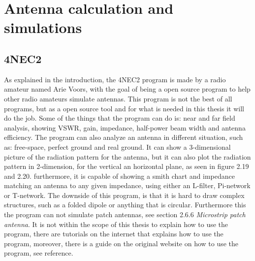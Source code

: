 \chapter{Antenna calculation and simulations}
\section{4NEC2}
As explained in the introduction, the 4NEC2 program is made by a radio amateur named Arie Voors\cite{4nec2}, with the goal of being a open source program to help other radio amateurs simulate antennas. This program is not the best of all programs, but as a open source tool and for what is needed in this thesis it will do the job. Some of the things that the program can do is: near and far field analysis, showing VSWR, gain, impedance, half-power beam width and antenna efficiency. The program can also analyze an antenna in different situation, such as: free-space, perfect ground and real ground. It can show a 3-dimensional picture of the radiation pattern for the antenna, but it can also plot the radiation pattern in 2-dimension, for the vertical an horizontal plane, as seen in figure 2.19 and 2.20. furthermore, it is capable of showing a smith chart and impedance matching an antenna to any given impedance, using either an L-filter, Pi-network or T-network. The downside of this program, is that it is hard to draw complex structures, such as a folded dipole or anything that is circular. Furthermore this the program can not simulate patch antennas, see section 2.6.6 \textit{Microstrip patch antenna}. It is not within the scope of this thesis to explain how to use the program, there are tutorials on the internet that explains how to use the program, moreover, there is a guide on the original website on how to use the program, see reference\cite{4NEC2Guide}. 

